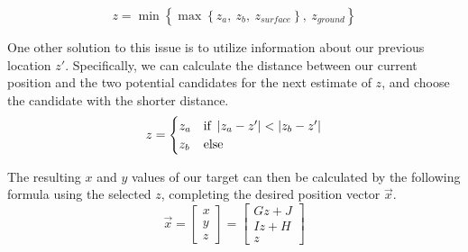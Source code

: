 \begin{equation}
	z=\min\left\{\max\left\{z_a,~z_b,~z_{surface}\right\},~z_{ground}\right\}
\end{equation}	

One other solution to this issue is to utilize information about our previous location $z'$. Specifically, we can calculate the distance between our current position and the two potential candidates for the next estimate of $z$, and choose the candidate with the shorter distance.
\begin{equation}
	z=\begin{cases}
		z_a & \text{if }\left|{z_a-z'}\right|<\left|{z_b-z'}\right|\\
		z_b & \text{else}
	\end{cases}
\end{equation}	

The resulting $x$ and $y$ values of our target can then be calculated by the following formula using the selected $z$, completing the desired position vector $\vec{x}$.
\begin{equation}
	\vec{x}
	=\left[
	\begin{array}{c}
		x\\
		y\\
		z
	\end{array}
	\right]
	=\left[
	\begin{array}{c}
		{G}z+{J}\\
		{I}z+{H}\\
		z
	\end{array}
	\right]
\end{equation}	